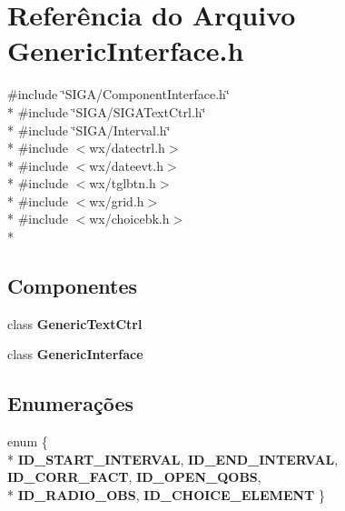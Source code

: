 \section{Referência do Arquivo Generic\+Interface.\+h}
\label{_generic_interface_8h}
{\ttfamily \#include \char`\"{}S\+I\+G\+A/\+Component\+Interface.\+h\char`\"{}}\\*
{\ttfamily \#include \char`\"{}S\+I\+G\+A/\+S\+I\+G\+A\+Text\+Ctrl.\+h\char`\"{}}\\*
{\ttfamily \#include \char`\"{}S\+I\+G\+A/\+Interval.\+h\char`\"{}}\\*
{\ttfamily \#include $<$wx/datectrl.\+h$>$}\\*
{\ttfamily \#include $<$wx/dateevt.\+h$>$}\\*
{\ttfamily \#include $<$wx/tglbtn.\+h$>$}\\*
{\ttfamily \#include $<$wx/grid.\+h$>$}\\*
{\ttfamily \#include $<$wx/choicebk.\+h$>$}\\*
\subsection*{Componentes}
\begin{DoxyCompactItemize}
\item 
class {\bf Generic\+Text\+Ctrl}
\item 
class {\bf Generic\+Interface}
\end{DoxyCompactItemize}
\subsection*{Enumerações}
\begin{DoxyCompactItemize}
\item 
enum \{ \\*
{\bf I\+D\+\_\+\+S\+T\+A\+R\+T\+\_\+\+I\+N\+T\+E\+R\+V\+AL}, 
{\bf I\+D\+\_\+\+E\+N\+D\+\_\+\+I\+N\+T\+E\+R\+V\+AL}, 
{\bf I\+D\+\_\+\+C\+O\+R\+R\+\_\+\+F\+A\+CT}, 
{\bf I\+D\+\_\+\+O\+P\+E\+N\+\_\+\+Q\+O\+BS}, 
\\*
{\bf I\+D\+\_\+\+R\+A\+D\+I\+O\+\_\+\+O\+BS}, 
{\bf I\+D\+\_\+\+C\+H\+O\+I\+C\+E\+\_\+\+E\+L\+E\+M\+E\+NT}
 \}
\end{DoxyCompactItemize}
